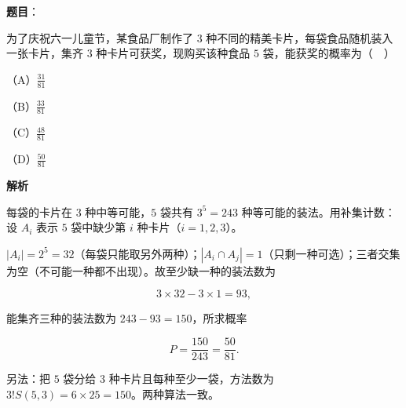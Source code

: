 \begin{answer}

\textbf{题目}：

为了庆祝六一儿童节，某食品厂制作了 $3$ 种不同的精美卡片，每袋食品随机装入一张卡片，集齐 $3$ 种卡片可获奖，现购买该种食品 $5$ 袋，能获奖的概率为（　）

（A）$\frac{31}{81}$

（B）$\frac{33}{81}$

（C）$\frac{48}{81}$

（D）$\frac{50}{81}$

\textbf{解析}

每袋的卡片在 $3$ 种中等可能，$5$ 袋共有 $3^5=243$ 种等可能的装法。用补集计数：设 $A_i$ 表示 $5$ 袋中缺少第 $i$ 种卡片（$i=1,2,3$）。

$|A_i|=2^5=32$（每袋只能取另外两种）；$|A_i\cap A_j|=1$（只剩一种可选）；三者交集为空（不可能一种都不出现）。故至少缺一种的装法数为

\nopagebreak[4]
\[3\times32-3\times1=93,\]

能集齐三种的装法数为 $243-93=150$，所求概率

\nopagebreak[4]
\[P=\frac{150}{243}=\frac{50}{81}.\]

另法：把 $5$ 袋分给 $3$ 种卡片且每种至少一袋，方法数为 $3!S(5,3)=6\times25=150$。两种算法一致。


\end{answer}
